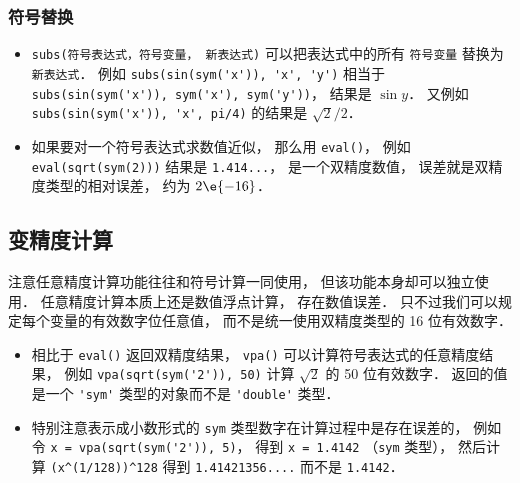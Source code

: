 \subsubsection{符号替换}
\begin{itemize}
\item \verb|subs(符号表达式，符号变量， 新表达式)| 可以把表达式中的所有 \verb|符号变量| 替换为 \verb|新表达式|． 例如 \verb|subs(sin(sym('x')), 'x', 'y')| 相当于 \verb|subs(sin(sym('x')), sym('x'), sym('y'))|， 结果是 $\sin y$． 又例如 \verb|subs(sin(sym('x')), 'x', pi/4)| 的结果是 $\sqrt 2/2$．
\item 如果要对一个符号表达式求数值近似， 那么用 \verb|eval()|， 例如 \verb|eval(sqrt(sym(2)))| 结果是 \verb|1.414...|， 是一个双精度数值， 误差就是双精度类型的相对误差， 约为 $2\e{-16}$．
\end{itemize}

\subsection{变精度计算}
注意任意精度计算功能往往和符号计算一同使用， 但该功能本身却可以独立使用． 任意精度计算本质上还是数值浮点计算， 存在数值误差． 只不过我们可以规定每个变量的有效数字位任意值， 而不是统一使用双精度类型的 16 位有效数字．

\begin{itemize}
\item 相比于 \verb|eval()| 返回双精度结果， \verb|vpa()| 可以计算符号表达式的任意精度结果， 例如 \verb|vpa(sqrt(sym('2')), 50)| 计算 $\sqrt{2}$ 的 50 位有效数字． 返回的值是一个 \verb|'sym'| 类型的对象而不是 \verb|'double'| 类型．
\item  特别注意表示成小数形式的 \verb|sym| 类型数字在计算过程中是存在误差的， 例如令 \verb|x = vpa(sqrt(sym('2')), 5)|， 得到 \verb|x = 1.4142| （\verb|sym| 类型）， 然后计算 \verb|(x^(1/128))^128| 得到 \verb|1.41421356....| 而不是 \verb|1.4142|．
\end{itemize}

